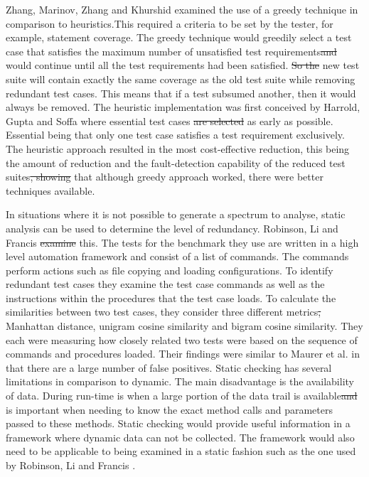 \documentclass[11pt
              , a4paper
              , twoside
              , openright
              ]{report}
\providecommand{\DIFadd}[1]{{\protect\color{blue}\uwave{#1}}} %
\providecommand{\DIFdel}[1]{{\protect\color{red}\sout{#1}}}                      %
\providecommand{\DIFaddbegin}{} %
\providecommand{\DIFaddend}{} %
\providecommand{\DIFdelbegin}{} %
\providecommand{\DIFdelend}{} %
\begin{document}
Zhang, Marinov, Zhang and Khurshid \cite{zhang2011empirical} examined the use of a greedy technique in comparison to heuristics.This required a criteria to be set by the tester, for example, statement coverage. The greedy technique would greedily select a test case that satisfies the maximum number of unsatisfied test requirements\DIFdelbegin \DIFdel{and }\DIFdelend \DIFaddbegin \DIFadd{. It }\DIFaddend would continue until all the test requirements had been satisfied. \DIFdelbegin \DIFdel{So the }\DIFdelend \DIFaddbegin \DIFadd{The }\DIFaddend new test suite will contain exactly the same coverage as the old test suite while removing redundant test cases. This means that if a test subsumed another, then it would always be removed. The heuristic implementation was first conceived by Harrold, Gupta and Soffa \cite{harrold1993methodology} where \DIFaddbegin \DIFadd{it selects }\DIFaddend essential test cases \DIFdelbegin \DIFdel{are selected }\DIFdelend as early as possible. Essential being that only one test case satisfies a test requirement exclusively. The heuristic approach resulted in the most cost-effective reduction, this being the amount of reduction and the fault-detection capability of the reduced test suites\DIFdelbegin \DIFdel{, showing }\DIFdelend \DIFaddbegin \DIFadd{. This showed }\DIFaddend that although greedy approach worked, there were better techniques available.

In situations where it is not possible to generate a spectrum to analyse, static analysis can be used to determine the level of redundancy. Robinson, Li and Francis \cite{li2008static} \DIFdelbegin \DIFdel{examine }\DIFdelend \DIFaddbegin \DIFadd{explore }\DIFaddend this. The tests for the benchmark they use are written in a high level automation framework and consist of a list of commands. The commands perform actions such as file copying and loading configurations. To identify redundant test cases they examine the test case commands as well as the instructions within the procedures that the test case loads. To calculate the similarities between two test cases, they consider three different metrics\DIFdelbegin \DIFdel{, }\DIFdelend \DIFaddbegin \DIFadd{. These are the }\DIFaddend Manhattan distance, unigram cosine similarity and bigram cosine similarity. They each were measuring how closely related two tests were based on the sequence of commands and procedures loaded. Their findings were similar to Maurer et al. \cite{koochakzadeh2009test} in that there are a large number of false positives. Static checking has several limitations in comparison to dynamic. The main disadvantage is the availability of data. During run-time is when a large portion of the data trail is available\DIFdelbegin \DIFdel{and }\DIFdelend \DIFaddbegin \DIFadd{. This }\DIFaddend is important when needing to know the exact method calls and parameters passed to these methods. Static checking would provide useful information in a framework where dynamic data can not be collected. The framework would also need to be applicable to being examined in a static fashion such as the one used by Robinson, Li and Francis \cite{li2008static}.
\end{document}
